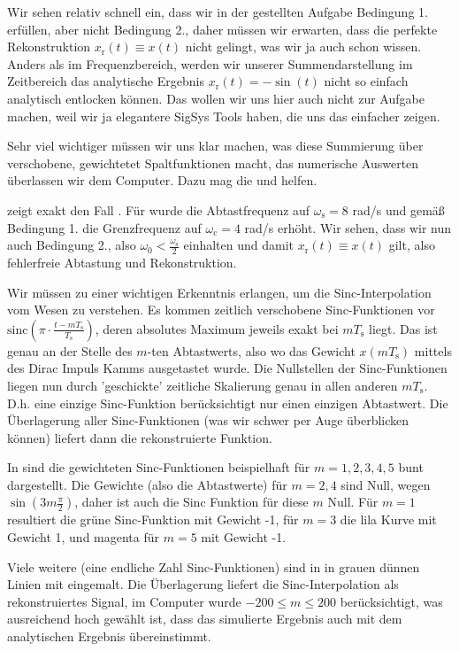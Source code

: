 \begin{Loesung}
Wir sehen relativ schnell ein, dass wir in der gestellten Aufgabe Bedingung 1.
erfüllen, aber nicht Bedingung 2., daher müssen wir erwarten, dass die perfekte
Rekonstruktion $x_\mathrm{r}(t) \equiv x(t)$ nicht gelingt,
was wir ja auch schon wissen.
%
Anders als im Frequenzbereich, werden wir unserer Summendarstellung
 im Zeitbereich das analytische Ergebnis
$x_\mathrm{r}(t)=-\sin(t)$ nicht so einfach analytisch entlocken können.
Das wollen wir uns hier auch nicht zur Aufgabe machen, weil wir ja elegantere
SigSys Tools haben, die uns das einfacher zeigen.
%

Sehr viel wichtiger müssen wir uns klar machen, was diese Summierung über
verschobene, gewichtetet Spaltfunktionen macht, das numerische Auswerten
überlassen wir dem Computer. Dazu mag die
und
helfen.


 zeigt exakt den Fall
.
%
Für  wurde die Abtastfrequenz
auf $\omega_\mathrm{s}=8$ rad/s und gemäß Bedingung 1. die Grenzfrequenz
auf $\omega_\mathrm{c}=4$ rad/s erhöht. Wir sehen, dass wir nun auch Bedingung
2., also $\omega_0 < \frac{\omega_\mathrm{s}}{2}$ einhalten und damit
$x_\mathrm{r}(t) \equiv x(t)$ gilt, also fehlerfreie Abtastung und Rekonstruktion.

Wir müssen zu einer wichtigen Erkenntnis erlangen, um die Sinc-Interpolation
vom Wesen zu verstehen.
Es kommen zeitlich verschobene Sinc-Funktionen vor
$\mathrm{sinc}\left(\pi \cdot \frac{t-m T_\mathrm{s}}{T_\mathrm{s}}\right)$,
deren absolutes Maximum jeweils exakt bei $m T_\mathrm{s}$ liegt. Das ist
genau an der Stelle des $m$-ten Abtastwerts, also wo das Gewicht
$x(m T_\mathrm{s})$ mittels des Dirac Impuls Kamms ausgetastet wurde.
Die Nullstellen der Sinc-Funktionen liegen
nun durch 'geschickte' zeitliche Skalierung genau in allen anderen
$m T_\mathrm{s}$. D.h.
eine einzige Sinc-Funktion berücksichtigt nur einen einzigen Abtastwert.
Die Überlagerung aller Sinc-Funktionen (was wir schwer per Auge überblicken können)
liefert dann die rekonstruierte Funktion.

In  sind die gewichteten Sinc-Funktionen
beispielhaft
für $m=1,2,3,4,5$ bunt dargestellt. Die Gewichte (also die Abtastwerte) für $m=2,4$
sind Null, wegen $\sin(3 m \frac{\pi}{2})$, daher ist auch die Sinc Funktion für diese
$m$ Null. Für $m=1$ resultiert die grüne Sinc-Funktion mit Gewicht -1, für $m=3$
die lila Kurve mit Gewicht 1, und magenta für $m=5$ mit Gewicht -1.

Viele weitere (eine endliche Zahl Sinc-Funktionen) sind in in grauen dünnen Linien
mit eingemalt. Die Überlagerung liefert die Sinc-Interpolation als rekonstruiertes
Signal, im Computer wurde $-200\leq m\leq 200$ berücksichtigt,
was ausreichend hoch gewählt ist,
dass das simulierte Ergebnis auch mit dem analytischen Ergebnis übereinstimmt.

\end{Loesung}
